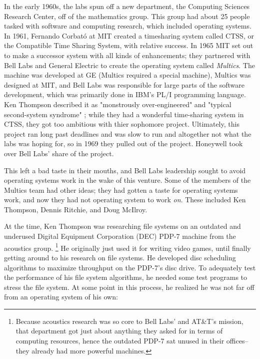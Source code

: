 In the early 1960s, the labs spun off a new department, the Computing Sciences Research Center,
off of the mathematics group. This group had about 25 people tasked with software and computing
research, which included operating systems.
In 1961, Fernando Corbat\'{o} at MIT created a timesharing system called CTSS,
or the Compatible Time Sharing System, with relative success.
In 1965 MIT set out to make a successor system with all kinds of enhancements; they partnered with
Bell Labs and General Electric to create the operating system called \textit{Multics}.
The machine was developed at GE (Multics required a special machine), Multics was designed at MIT,
and Bell Labs was responsible for large parts of the software development,
which was primarily done in IBM's PL/I programming language.
Ken Thompson described it as "monstrously over-engineered" and "typical second-system syndrome"
\cite{kernighan_interviews_thompson_2019};
while they had a wonderful time-sharing system in CTSS, they got too ambitious with thier sophomore project.
Ultimately, this project ran long past deadlines and was slow to run and altogether not what
the labs was hoping for, so in 1969 they pulled out of the project.
Honeywell took over Bell Labs' share of the project.

This left a bad taste in their mouths, and Bell Labs leadership sought to avoid operating
systems work in the wake of this venture.
Some of the members of the Multics team had other ideas; they had gotten a taste for
operating systems work, and now they had not operating system to work \textit{on}.
These included Ken Thompson, Dennis Ritchie, and Doug McIlroy.

At the time, Ken Thompson was researching file systems on an outdated and underused
Digital Equipment Corporation (DEC) PDP-7 machine from the acoustics group.
\footnote{Because acoustics research was so core to Bell Labs' and AT\&T's mission,
	that department got just about anything they asked for in terms of computing resources,
	hence the outdated PDP-7 sat unused in their offices--they already had more powerful machines.}
He originally just used it for writing video games, until finally getting around to
his research on file systems.
He developed disc scheduling algorithms to maximize throughput on the PDP-7's disc drive.
To adequately test the performance of his file system algorithms, he needed some test
programs to stress the file system.
At some point in this process, he realized he was not far off from an
operating system of his own\cite{kernighan_interviews_thompson_2019}:

